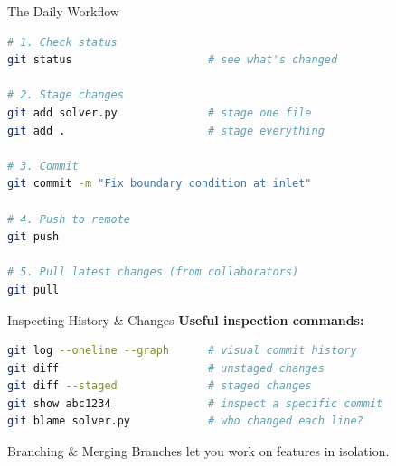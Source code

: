 \documentclass[aspectratio=169, 11pt]{beamer}
\begin{document}
\begin{frame}[fragile]{The Daily Workflow}
  \begin{lstlisting}[language=bash]
# 1. Check status
git status                     # see what's changed

# 2. Stage changes
git add solver.py              # stage one file
git add .                      # stage everything

# 3. Commit
git commit -m "Fix boundary condition at inlet"

# 4. Push to remote
git push

# 5. Pull latest changes (from collaborators)
git pull
  \end{lstlisting}
\end{frame}

\begin{frame}[fragile]{Inspecting History \& Changes}
  \vspace{0.3em}
  \textbf{Useful inspection commands:}
  \begin{lstlisting}[language=bash]
git log --oneline --graph      # visual commit history
git diff                       # unstaged changes
git diff --staged              # staged changes
git show abc1234               # inspect a specific commit
git blame solver.py            # who changed each line?
  \end{lstlisting}
\end{frame}

\begin{frame}[fragile]{Branching \& Merging}
  Branches let you work on features in isolation.

  \begin{center}
  \end{center}
\end{frame}
\end{document}
